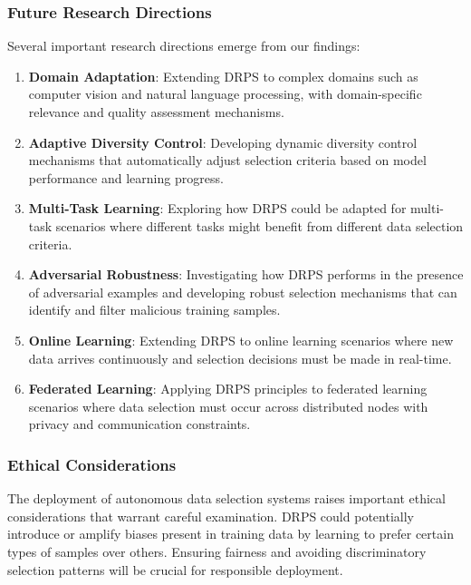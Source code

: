 \documentclass[12pt]{article}
\begin{document}
\subsubsection{Future Research Directions}\label{future-research}

Several important research directions emerge from our findings:

\begin{enumerate}
\item \textbf{Domain Adaptation}: Extending DRPS to complex domains such as computer vision and natural language processing, with domain-specific relevance and quality assessment mechanisms.

\item \textbf{Adaptive Diversity Control}: Developing dynamic diversity control mechanisms that automatically adjust selection criteria based on model performance and learning progress.

\item \textbf{Multi-Task Learning}: Exploring how DRPS could be adapted for multi-task scenarios where different tasks might benefit from different data selection criteria.

\item \textbf{Adversarial Robustness}: Investigating how DRPS performs in the presence of adversarial examples and developing robust selection mechanisms that can identify and filter malicious training samples.

\item \textbf{Online Learning}: Extending DRPS to online learning scenarios where new data arrives continuously and selection decisions must be made in real-time.

\item \textbf{Federated Learning}: Applying DRPS principles to federated learning scenarios where data selection must occur across distributed nodes with privacy and communication constraints.
\end{enumerate}

\subsubsection{Ethical Considerations}\label{ethical-considerations}

The deployment of autonomous data selection systems raises important ethical considerations that warrant careful examination. DRPS could potentially introduce or amplify biases present in training data by learning to prefer certain types of samples over others. Ensuring fairness and avoiding discriminatory selection patterns will be crucial for responsible deployment.
\end{document}
